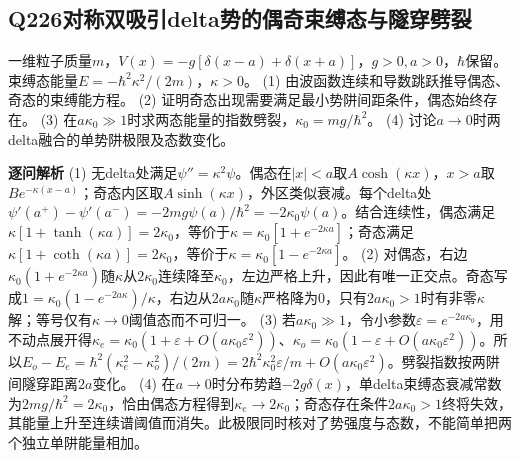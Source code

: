 \subsection*{Q226\quad 对称双吸引delta势的偶奇束缚态与隧穿劈裂}
一维粒子质量$m$，$V(x)=-g[\delta(x-a)+\delta(x+a)]$，$g>0,a>0$，$\hbar$保留。束缚态能量$E=-\hbar^2\kappa^2/(2m)$，$\kappa>0$。
(1) 由波函数连续和导数跳跃推导偶态、奇态的束缚能方程。
(2) 证明奇态出现需要满足最小势阱间距条件，偶态始终存在。
(3) 在$a\kappa_0\gg1$时求两态能量的指数劈裂，$\kappa_0=mg/\hbar^2$。
(4) 讨论$a\to0$时两delta融合的单势阱极限及态数变化。
\par\textbf{逐问解析}
(1) 无delta处满足$\psi''=\kappa^2\psi$。偶态在$|x|<a$取$A\cosh(\kappa x)$，$x>a$取$Be^{-\kappa(x-a)}$；奇态内区取$A\sinh(\kappa x)$，外区类似衰减。每个delta处$\psi'(a^+)-\psi'(a^-)=-2mg\psi(a)/\hbar^2=-2\kappa_0\psi(a)$。结合连续性，偶态满足$\kappa[1+\tanh(\kappa a)]=2\kappa_0$，等价于$\kappa=\kappa_0[1+e^{-2\kappa a}]$；奇态满足$\kappa[1+\coth(\kappa a)]=2\kappa_0$，等价于$\kappa=\kappa_0[1-e^{-2\kappa a}]$。
(2) 对偶态，右边$\kappa_0(1+e^{-2\kappa a})$随$\kappa$从$2\kappa_0$连续降至$\kappa_0$，左边严格上升，因此有唯一正交点。奇态写成$1=\kappa_0(1-e^{-2a\kappa})/\kappa$，右边从$2a\kappa_0$随$\kappa$严格降为0，只有$2a\kappa_0>1$时有非零$\kappa$解；等号仅有$\kappa\to0$阈值态而不可归一。
(3) 若$a\kappa_0\gg1$，令小参数$\varepsilon=e^{-2a\kappa_0}$，用不动点展开得$\kappa_e=\kappa_0(1+\varepsilon+O(a\kappa_0\varepsilon^2))$、$\kappa_o=\kappa_0(1-\varepsilon+O(a\kappa_0\varepsilon^2))$。所以$E_o-E_e=\hbar^2(\kappa_e^2-\kappa_o^2)/(2m)=2\hbar^2\kappa_0^2\varepsilon/m+O(a\kappa_0\varepsilon^2)$。劈裂指数按两阱间隧穿距离$2a$变化。
(4) 在$a\to0$时分布势趋$-2g\delta(x)$，单delta束缚态衰减常数为$2mg/\hbar^2=2\kappa_0$，恰由偶态方程得到$\kappa_e\to2\kappa_0$；奇态存在条件$2a\kappa_0>1$终将失效，其能量上升至连续谱阈值而消失。此极限同时核对了势强度与态数，不能简单把两个独立单阱能量相加。
\par\medskip
